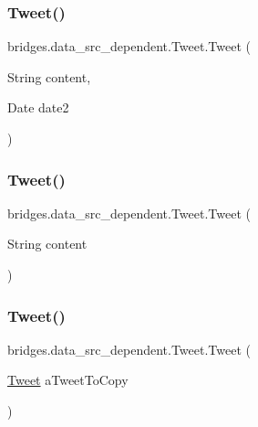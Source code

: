 \subsubsection{\texorpdfstring{Tweet()}{Tweet()}\hspace{0.1cm}{\footnotesize\ttfamily [1/3]}}
{\footnotesize\ttfamily bridges.\+data\+\_\+src\+\_\+dependent.\+Tweet.\+Tweet (\begin{DoxyParamCaption}\item[{String}]{content,  }\item[{Date}]{date2 }\end{DoxyParamCaption})}

\mbox{\label{classbridges_1_1data__src__dependent_1_1_tweet_a611e969f630c86098b204cfb4655f79b}} 
\subsubsection{\texorpdfstring{Tweet()}{Tweet()}\hspace{0.1cm}{\footnotesize\ttfamily [2/3]}}
{\footnotesize\ttfamily bridges.\+data\+\_\+src\+\_\+dependent.\+Tweet.\+Tweet (\begin{DoxyParamCaption}\item[{String}]{content }\end{DoxyParamCaption})}

\mbox{\label{classbridges_1_1data__src__dependent_1_1_tweet_a0b0ee5fa9a6221da95020bd5f78667d9}} 
\subsubsection{\texorpdfstring{Tweet()}{Tweet()}\hspace{0.1cm}{\footnotesize\ttfamily [3/3]}}
{\footnotesize\ttfamily bridges.\+data\+\_\+src\+\_\+dependent.\+Tweet.\+Tweet (\begin{DoxyParamCaption}\item[{\mbox{\hyperlink{classbridges_1_1data__src__dependent_1_1_tweet}{Tweet}}}]{a\+Tweet\+To\+Copy }\end{DoxyParamCaption})}




